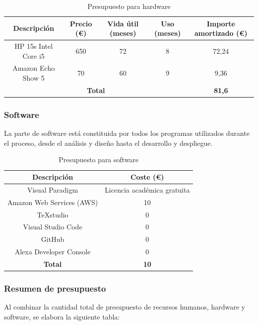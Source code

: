 \begin{table}[H]
    \centering
    \begin{tabular}{|c|c|c|c|c|}
    \hline
    \rowcolor{lightgray}
    \textbf{Descripción} & \textbf{Precio (€)} & \textbf{Vida útil (meses}) & \textbf{Uso (meses)} & \textbf{Importe amortizado (€)}\\
    \hline
    HP 15s Intel Core i5 & 650 & 72 & 8 & 72,24 \\
    \hline
    Amazon Echo Show 5 & 70 & 60 & 9 & 9,36 \\
    \hline
    \multicolumn{4}{|c|}{\textbf{Total}} & \textbf{81,6} \\
    \hline
    \end{tabular}
    \caption{Presupuesto para hardware}
    \label{tab:presupuesto-hw}
\end{table}

\subsubsection{Software}
La parte de software está constituida por todos los programas utilizados durante el proceso, desde el análisis y diseño hasta el desarrollo y despliegue.  

\begin{table}[H]
    \centering
    \begin{tabular}{|c|c|}
    \hline
    \rowcolor{lightgray}
    \textbf{Descripción} & \textbf{Coste (€)}\\
    \hline
    Visual Paradigm & Licencia académica gratuita \\
    \hline
    Amazon Web Services (AWS) & 10 \\
    \hline
    TeXstudio & 0 \\
    \hline
    Visual Studio Code & 0 \\
    \hline
    GitHub & 0 \\
    \hline
    Alexa Developer Console & 0 \\
    \hline
    \textbf{Total} & \textbf{10} \\
    \hline
    \end{tabular}
    \caption{Presupuesto para software}
    \label{tab:presupuesto-sw}
\end{table}

\subsubsection{Resumen de presupuesto}
Al combinar la cantidad total de presupuesto de recursos humanos, hardware y software, se elabora la siguiente tabla:

